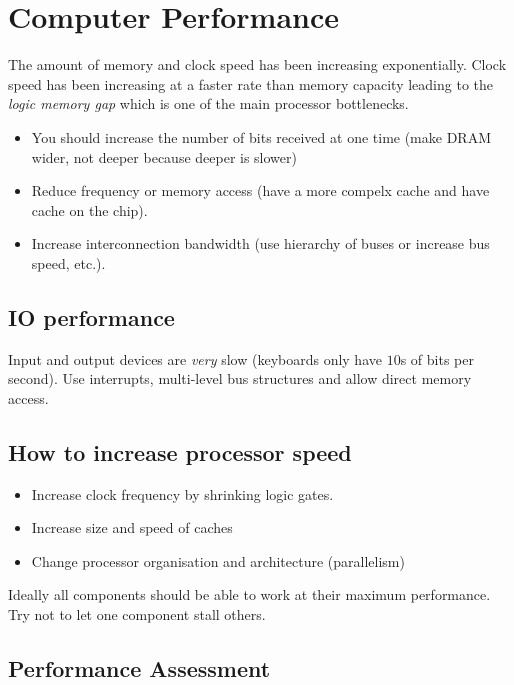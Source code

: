 \section{Computer Performance}\label{sec:computer_performance}

The amount of memory and clock speed has been increasing exponentially.
Clock speed has been increasing at a faster rate than memory capacity leading to the \emph{logic memory gap} which is one of the main processor bottlenecks.

\begin{itemize}
    \item You should increase the number of bits received at one time (make DRAM wider, not deeper because deeper is slower)
    \item Reduce frequency or memory access (have a more compelx cache and have cache on the chip).
    \item Increase interconnection bandwidth (use hierarchy of buses or increase bus speed, etc.).
\end{itemize}

\subsection{IO performance}\label{sub:io_performance}

Input and output devices are \emph{very} slow (keyboards only have \(10\)s of bits per second).
Use interrupts, multi-level bus structures and allow direct memory access.

\subsection{How to increase processor speed}\label{sub:how_to_increase_processor_speed}

\begin{itemize}
    \item Increase clock frequency by shrinking logic gates.
    \item Increase size and speed of caches
    \item Change processor organisation and architecture (parallelism)
\end{itemize}
%
Ideally all components should be able to work at their maximum performance.
Try not to let one component stall others.

\subsection{Performance Assessment}\label{sub:performance_asssessment}

